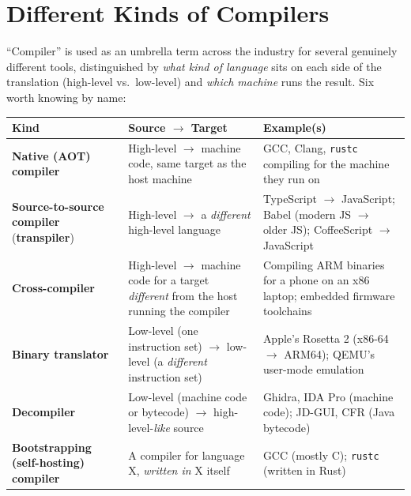 \documentclass[full-course-notes.tex]{subfiles}
\begin{document}
\section{Different Kinds of Compilers}
\label{sec:l1-kinds}

\beyonddb ``Compiler'' is used as an umbrella term across the industry for several genuinely
different tools, distinguished by \emph{what kind of language} sits on each side of the
translation (high-level vs.\ low-level) and \emph{which machine} runs the result. Six worth
knowing by name:

\begin{center}
\renewcommand{\arraystretch}{1.45}
\begin{tabularx}{\textwidth}{@{}p{2.7cm} p{3.6cm} X@{}}
\toprule
\textbf{Kind} & \textbf{Source $\to$ Target} & \textbf{Example(s)} \\
\midrule
\textbf{Native (AOT) compiler} & High-level $\to$ machine code, same target as the host machine
& GCC, Clang, \texttt{rustc} compiling for the machine they run on \\
\textbf{Source-to-source compiler} (\textbf{transpiler}) & High-level $\to$ a \emph{different}
high-level language & TypeScript $\to$ JavaScript; Babel (modern JS $\to$ older JS); CoffeeScript
$\to$ JavaScript \\
\textbf{Cross-compiler} & High-level $\to$ machine code for a target \emph{different} from the
host running the compiler & Compiling ARM binaries for a phone on an x86 laptop; embedded
firmware toolchains \\
\textbf{Binary translator} & Low-level (one instruction set) $\to$ low-level (a \emph{different}
instruction set) & Apple's Rosetta 2 (x86-64 $\to$ ARM64); QEMU's user-mode emulation \\
\textbf{Decompiler} & Low-level (machine code or bytecode) $\to$ high-level-\emph{like} source &
Ghidra, IDA Pro (machine code); JD-GUI, CFR (Java bytecode) \\
\textbf{Bootstrapping (self-hosting) compiler} & A compiler for language X, \emph{written in} X
itself & GCC (mostly C); \texttt{rustc} (written in Rust) \\
\bottomrule
\end{tabularx}
\end{center}
\end{document}
